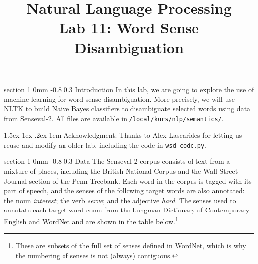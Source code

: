 \documentclass[11pt]{article}
\title{{\LARGE Natural Language Processing}\\[1.5mm]{\large Lab 11: Word Sense Disambiguation}}
\author{}
\date{} %
\makeatletter
\newcommand{\newsec}[2]{\section{#1}\label{sec:#2}\noindent}
\renewcommand{\section}{\@startsection
{section}%
{1}%
{0mm}%
{-0.8\baselineskip}%
{0.3\baselineskip}%
{\bfseries\large}}%
\renewcommand{\paragraph}{%
  \@startsection{paragraph}{4}%
  {\z@}{1.5ex \@plus 1ex \@minus .2ex}{-1em}%
  {\normalfont\normalsize\bfseries}%
}\makeatother
\makeatother
\begin{document}
 

\maketitle
\vspace{-2mm}
\newsec{Introduction}{intro}%
In this lab, we are going to explore the use of machine learning for word sense disambiguation.
More precisely, we will use NLTK to build Naive Bayes classifiers to disambiguate selected words
using data from Senseval-2. All files are available in {\tt /local/kurs/nlp/semantics/}.

\paragraph{Acknowledgment:} Thanks to Alex Lascarides for letting us reuse
and modify an older lab, including the code in {\tt wsd\_code.py}.

\newsec{Data}{data}%
The Senseval-2 corpus consists of text from a mixture of places,
including the British National Corpus and the Wall Street Journal
section of the Penn Treebank. Each word in the corpus is tagged with
its part of speech, and the senses of the following target words are
also annotated: the noun {\em interest}; the verb {\em serve}; and the
adjective {\em hard}. The senses used to annotate each target word
come from the Longman Dictionary of Contemporary English and WordNet
and are shown in the table below.\footnote{These are subsets of the
  full set of senses defined in WordNet, which is why the numbering of
  senses is not (always) contiguous.}
\end{document}
